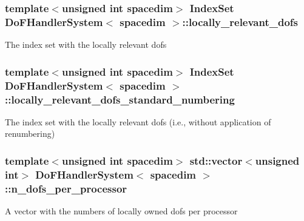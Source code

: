 \subsubsection[{\texorpdfstring{locally\+\_\+relevant\+\_\+dofs}{locally_relevant_dofs}}]{\setlength{\rightskip}{0pt plus 5cm}template$<$unsigned int spacedim$>$ {\bf Index\+Set} {\bf Do\+F\+Handler\+System}$<$ spacedim $>$\+::locally\+\_\+relevant\+\_\+dofs\hspace{0.3cm}{\ttfamily [private]}}\hypertarget{class_do_f_handler_system_a6b2de0e80cf0e67e62391cc84f8a7be5}{}\label{class_do_f_handler_system_a6b2de0e80cf0e67e62391cc84f8a7be5}
The index set with the locally relevant dofs 
\subsubsection[{\texorpdfstring{locally\+\_\+relevant\+\_\+dofs\+\_\+standard\+\_\+numbering}{locally_relevant_dofs_standard_numbering}}]{\setlength{\rightskip}{0pt plus 5cm}template$<$unsigned int spacedim$>$ {\bf Index\+Set} {\bf Do\+F\+Handler\+System}$<$ spacedim $>$\+::locally\+\_\+relevant\+\_\+dofs\+\_\+standard\+\_\+numbering\hspace{0.3cm}{\ttfamily [private]}}\hypertarget{class_do_f_handler_system_a0e6744c40aada76d695f2c564f4c5040}{}\label{class_do_f_handler_system_a0e6744c40aada76d695f2c564f4c5040}
The index set with the locally relevant dofs (i.\+e., without application of renumbering) 
\subsubsection[{\texorpdfstring{n\+\_\+dofs\+\_\+per\+\_\+processor}{n_dofs_per_processor}}]{\setlength{\rightskip}{0pt plus 5cm}template$<$unsigned int spacedim$>$ std\+::vector$<$unsigned int$>$ {\bf Do\+F\+Handler\+System}$<$ spacedim $>$\+::n\+\_\+dofs\+\_\+per\+\_\+processor\hspace{0.3cm}{\ttfamily [private]}}\hypertarget{class_do_f_handler_system_acfe853db91a67d1f78e08d62d91bab1b}{}\label{class_do_f_handler_system_acfe853db91a67d1f78e08d62d91bab1b}
A vector with the numbers of locally owned dofs per processor 

